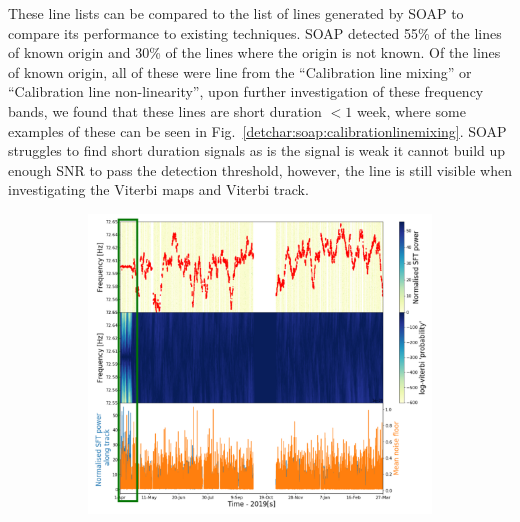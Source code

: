 These line lists can be compared to the list of lines generated by SOAP to compare its performance to existing techniques.
SOAP detected 55\% of the lines of known origin and 30\% of the lines where the origin is not known.
Of the lines of known origin, all of these were line from the ``Calibration line mixing'' or ``Calibration line non-linearity'', upon further investigation of these frequency bands, we found that these lines are short duration $< 1$ week, where some examples of these can be seen in Fig.~\ref{detchar:soap:calibrationlinemixing}.
SOAP struggles to find short duration signals as is the signal is weak it cannot build up enough \gls{SNR} to pass the detection threshold, however, the line is still visible when investigating the Viterbi maps and Viterbi track. 
%
\begin{figure}[hpt]
	\centering
	\begin{subfigure}[h]{0.49\textwidth}
		\includegraphics[width=\textwidth]{C6_detchar/linemixing/track_F72_55_72_65.pdf}
		\caption{\label{detchar:soap:calibrationlinemixing:1}}
	\end{subfigure}
\begin{subfigure}[h]{0.49\textwidth}

\end{subfigure}
\end{figure}
